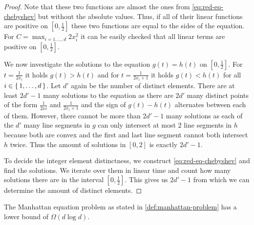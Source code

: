 \begin{proof}
	Note that these two functions are almost the ones from \cref{eq:red-eq-chebyshev} but without the absolute values. Thus, if all of their linear functions are positive on \([0,\frac{1}{2}]\) these two functions are equal to the sides of the equation. For \(C = \max_{i=1, \dots, d}2x_i^2\) it can be easily checked that all linear terms are positive on \([0, \frac{1}{2}]\).

	We now investigate the solutions to the equation \(g(t) = h(t)\) on \([0, \frac{1}{2}]\). For \(t = \frac{1}{2x_i}\) it holds \(g(t) > h(t)\) and for \(t = \frac{1}{2x_i + 1}\) it holds \(g(t) < h(t)\) for all \(i \in \set{1,\dots, d}\). Let \(d'\) again be the number of distinct elements. There are at least \(2d' - 1\) many solutions to the equation as there are \(2d'\) many distinct points of the form \(\frac{1}{2xi}\) and \(\frac{1}{2x_i+1}\) and the sign of \(g(t)-h(t)\) alternates between each of them. However, there cannot be more than \(2d'-1\) many solutions as each of the \(d'\) many line segments in \(g\) can only intersect at most \(2\) line segments in \(h\) because both are convex and the first and last line segment cannot both intersect \(h\) twice. Thus the amount of solutions in \([0,2]\) is exactly \(2d'-1\). 

	To decide the integer element distinctness, we construct \cref{eq:red-eq-chebyshev} and find the solutions. We iterate over them in linear time and count how many solutions there are in the interval \([0, \frac{1}{2}]\). This gives us \(2d'-1\) from which we can determine the amount of distinct elements.
\end{proof}

\begin{lemma}
	The Manhattan equation problem as stated in \cref{def:manhattan-problem} has a lower bound of \(\Omega(d \log d)\).
\end{lemma}

